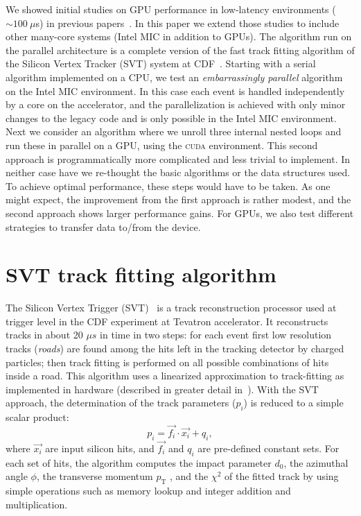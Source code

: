 \documentclass[a4]{jpconf}
\begin{document}
We showed initial studies on GPU performance in low-latency
environments ($\sim 100~\mu$s) in  previous
papers~\cite{TIPP2011,NSS2012}.  In this paper we extend those studies
to include other many-core systems (Intel MIC in addition to GPUs).
The algorithm run on the parallel architecture is a complete
version of the fast track fitting algorithm of the Silicon Vertex
Tracker (SVT) system at CDF~\cite{SVT1}.
Starting with a serial algorithm
implemented on a CPU, we test an \textit{embarrassingly parallel}
algorithm on the Intel MIC environment. In this case each event is
handled independently by a core on the accelerator, and the
parallelization is achieved with only minor changes to the legacy code
and is only possible in the Intel MIC environment. Next we consider an
algorithm where we unroll three internal nested loops and run these in
parallel on a GPU, using the \textsc{cuda} environment. This second
approach is programmatically more complicated and less trivial to
implement. In neither case have we re-thought the basic algorithms or
the data structures used. To achieve optimal performance, these steps
would have to be taken.  As one might expect, the improvement from the
first approach is rather modest, and the second approach shows larger
performance gains. For GPUs, we also test different strategies to transfer
 data to/from the device.

\section{SVT track fitting algorithm}
The Silicon Vertex Trigger (SVT)~\cite{SVT1,SVT2} is a 
track reconstruction processor used at 
trigger level in the CDF experiment at Tevatron accelerator. It reconstructs 
tracks in about 20 $\mu s$ in time in two steps: for each event 
first low resolution tracks (\textit{roads}) are found among the hits left 
in the tracking detector by charged particles; then track fitting is 
performed on all possible combinations of hits inside a road. 
This algorithm uses a linearized approximation to track-fitting as 
implemented in hardware (described in greater detail in~\cite{SVT3}). 
With the SVT approach, the determination of the track parameters 
($p_i$) is reduced to a simple scalar product:
\[
p_i = \vec{f_i} \cdot \vec{x_i} + q_i,
\]
where $\vec{x_i}$ are input silicon hits, and $\vec{f_i}$ and $q_i$ are 
pre-defined constant sets. For each set of hits, the algorithm
computes the impact parameter $d_0$, the azimuthal angle $\phi$, 
the transverse momentum $p_\mathrm{T}$ , and the $\chi^2$ of the
fitted track by using simple operations such as memory lookup and 
integer addition and multiplication.
\end{document}
